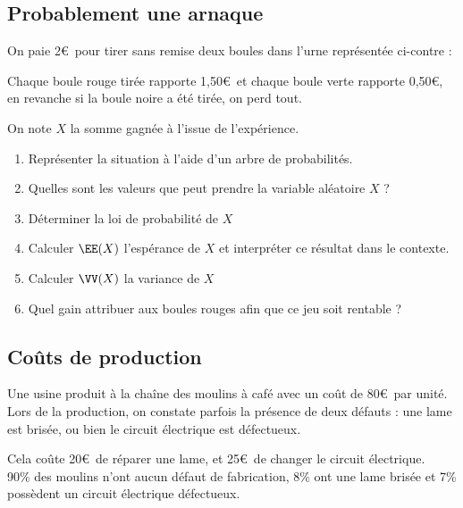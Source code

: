 \documentclass[oneside,12pt]{book}          %
\begin{document}
\subsection{Probablement une arnaque}
On paie 2\euro\, pour tirer sans remise deux boules dans l'urne représentée ci-contre :

Chaque boule rouge tirée rapporte 1,50\euro\, et chaque boule verte rapporte 0,50\euro, en revanche si la boule noire a été tirée, on perd tout.

On note $X$ la somme gagnée à l'issue de l'expérience.
\begin{enumerate}
    \item Représenter la situation à l'aide d'un arbre de probabilités.
    \item Quelles sont les valeurs que peut prendre la variable aléatoire $X$ ?
    \item Déterminer la loi de probabilité de $X$
    \item Calculer $\EE(X)$ l'espérance de $X$ et interpréter ce résultat dans le contexte.
    \item Calculer $\VV(X)$ la variance de $X$
    \item Quel gain attribuer aux boules rouges afin que ce jeu soit rentable ?
\end{enumerate}



\subsection{Coûts de production}
Une usine produit à la chaîne des moulins à café avec un coût de 80\euro\, par unité. \\
Lors de la production, on constate parfois la présence de deux défauts : une lame est brisée, ou bien le circuit électrique est défectueux.

Cela coûte 20\euro\, de réparer une lame, et 25\euro\, de changer le circuit électrique. \\
90\% des moulins n'ont aucun défaut de fabrication, 8\% ont une lame brisée et 7\% possèdent un circuit électrique défectueux.
\end{document}
